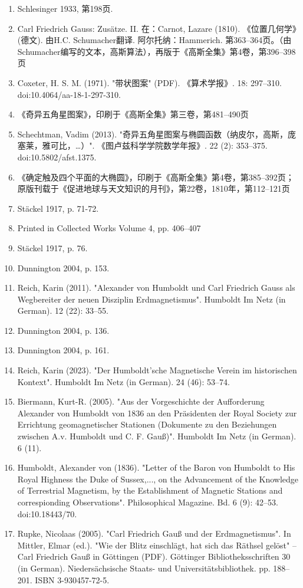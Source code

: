\begin{enumerate}
\item Schlesinger 1933, 第198页.  
\item Carl Friedrich Gauss: Zusätze. II. 在：Carnot, Lazare (1810). 《位置几何学》 (德文). 由H.C. Schumacher翻译. 阿尔托纳：Hammerich. 第363–364页。（由Schumacher编写的文本，高斯算法），再版于《高斯全集》第4卷，第396–398页  
\item Coxeter, H. S. M. (1971). "带状图案" (PDF). 《算术学报》. 18: 297–310. doi:10.4064/aa-18-1-297-310.  
\item 《奇异五角星图案》，印刷于《高斯全集》第三卷，第481–490页  
\item Schechtman, Vadim (2013). "奇异五角星图案与椭圆函数（纳皮尔，高斯，庞塞莱，雅可比，…）". 《图卢兹科学学院数学年报》. 22 (2): 353–375. doi:10.5802/afst.1375.  
\item 《确定触及四个平面的大椭圆》，印刷于《高斯全集》第4卷，第385–392页；原版刊载于《促进地球与天文知识的月刊》，第22卷，1810年，第112–121页
\item Stäckel 1917, p. 71-72.
\item Printed in Collected Works Volume 4, pp. 406–407
\item Stäckel 1917, p. 76.
\item Dunnington 2004, p. 153.
\item Reich, Karin (2011). "Alexander von Humboldt und Carl Friedrich Gauss als Wegbereiter der neuen Disziplin Erdmagnetismus". Humboldt Im Netz (in German). 12 (22): 33–55.
\item Dunnington 2004, p. 136.
\item Dunnington 2004, p. 161.
\item Reich, Karin (2023). "Der Humboldt'sche Magnetische Verein im historischen Kontext". Humboldt Im Netz (in German). 24 (46): 53–74.
\item Biermann, Kurt-R. (2005). "Aus der Vorgeschichte der Aufforderung Alexander von Humboldt von 1836 an den Präsidenten der Royal Society zur Errichtung geomagnetischer Stationen (Dokumente zu den Beziehungen zwischen A.v. Humboldt und C. F. Gauß)". Humboldt Im Netz (in German). 6 (11).
\item Humboldt, Alexander von (1836). "Letter of the Baron von Humboldt to His Royal Highness the Duke of Sussex,..., on the Advancement of the Knowledge of Terrestrial Magnetism, by the Establishment of Magnetic Stations and correspionding Observations". Philosophical Magazine. Bd. 6 (9): 42–53. doi:10.18443/70.
\item Rupke, Nicolaas (2005). "Carl Friedrich Gauß und der Erdmagnetismus". In Mittler, Elmar (ed.). "Wie der Blitz einschlägt, hat sich das Räthsel gelöst" – Carl Friedrich Gauß in Göttingen (PDF). Göttinger Bibliotheksschriften 30 (in German). Niedersächsische Staats- und Universitätsbibliothek. pp. 188–201. ISBN 3-930457-72-5.

\end{enumerate}
